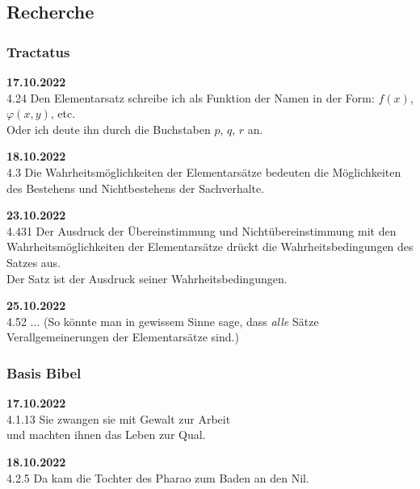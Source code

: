\documentclass[10pt,a4paper]{article}
\begin{document}
\printbibliography[keyword=Kindergeschichten, heading=subbibliography,
  title={Kindergeschichten}]


\printbibliography[keyword=Vorschule, heading=subbibliography,
  title={Vorschule}]


\printbibliography[keyword=Schule, heading=subbibliography,
  title={Schulbücher}]


\printbibliography[keyword=Evolution, heading=subbibliography,
  title={Evolution}]


\newpage
\subsection{Recherche}

\subsubsection{Tractatus}

{\bf 17.10.2022} \\
4.24 Den Elementarsatz schreibe ich als Funktion der Namen in der Form:
$f(x)$, $\varphi (x,y)$, etc. \\
Oder ich deute ihn durch die Buchstaben $p$, $q$, $r$ an.

\vskip 4pt
{\bf 18.10.2022} \\
4.3 Die Wahrheitsmöglichkeiten der Elementarsätze bedeuten die Möglichkeiten des
Bestehens und Nichtbestehens der Sachverhalte.

\vskip 4pt
{\bf 23.10.2022} \\
4.431 Der Ausdruck der Übereinstimmung und Nichtübereinstimmung mit den
Wahrheitsmöglichkeiten der Elementarsätze drückt die Wahrheitsbedingungen des
Satzes aus. \\
Der Satz ist der Ausdruck seiner Wahrheitsbedingungen.

\vskip 4pt
{\bf 25.10.2022} \\
4.52 $\ldots$ (So könnte man in gewissem Sinne sage, dass {\it alle} Sätze
Verallgemeinerungen der Elementarsätze sind.)


\subsubsection{Basis Bibel}

{\bf 17.10.2022} \\
4.1.13 Sie zwangen sie mit Gewalt zur Arbeit \\
und machten ihnen das Leben zur Qual.

\vskip 4pt
{\bf 18.10.2022} \\
4.2.5 Da kam die Tochter des Pharao zum Baden an den Nil.
\end{document}
